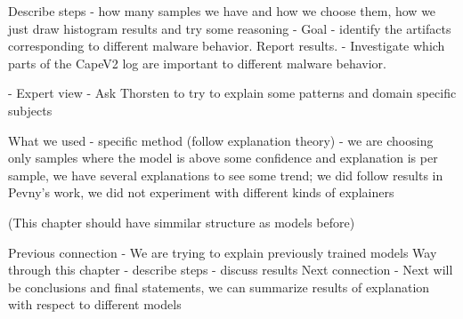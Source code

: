   Describe steps - how many samples we have and how we choose them, how we just draw histogram results and try some reasoning
  - Goal 
- identify the artifacts corresponding to different malware behavior. Report results.
- Investigate which parts of the CapeV2 log are important to different malware behavior. 

- Expert view
  - Ask Thorsten to try to explain some patterns and domain specific subjects 


  What we used - specific method (follow explanation theory) - we are choosing only samples where the model is above some confidence and explanation is per sample, we have several explanations to see some trend; we did follow results in Pevny's work, we did not experiment with different kinds of explainers
  

(This chapter should have simmilar structure as models before)

  Previous connection
- We are trying to explain previously trained models
Way through this chapter
- describe steps
- discuss results
Next connection
- Next will be conclusions and final statements, we can summarize results of explanation with respect to different models
